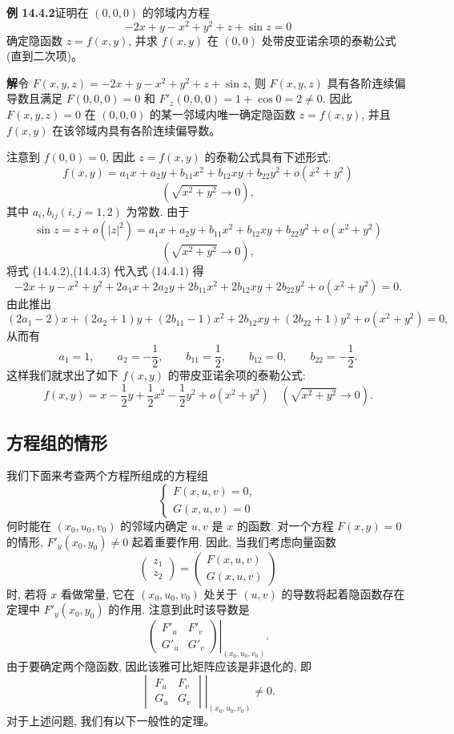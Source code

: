 \documentclass[UTF8, 12pt, fontset=fandol, oneside]{ctexart}
\begin{document}
\noindent\textbf{例 14.4.2}\quad 证明在 $(0,0,0)$ 的邻域内方程
\begin{equation}
  -2x+y-x^2+y^2+z+\sin z=0
  \tag{14.4.1}
\end{equation}
确定隐函数 $z=f(x,y)$, 并求 $f(x,y)$ 在 $(0,0)$ 处带皮亚诺余项的泰勒公式 (直到二次项)。

\noindent\textbf{解}\quad 令 $F(x,y,z)=-2x+y-x^2+y^2+z+\sin z$, 则 $F(x,y,z)$ 具有各阶连续偏导数且满足 $F(0,0,0)=0$ 和 $F'_z(0,0,0)=1+\cos0=2\ne0$. 因此 $F(x,y,z)=0$ 在 $(0,0,0)$ 的某一邻域内唯一确定隐函数 $z=f(x,y)$, 并且 $f(x,y)$ 在该邻域内具有各阶连续偏导数。

注意到 $f(0,0)=0$, 因此 $z=f(x,y)$ 的泰勒公式具有下述形式:
\begin{equation}
  f(x,y)=a_1x+a_2y+b_{11}x^2+b_{12}xy+b_{22}y^2+o(x^2+y^2)
  \tag{14.4.2}
\end{equation}
\[
  (\sqrt{x^2+y^2}\to0),
\]
其中 $a_i,b_{ij}(i,j=1,2)$ 为常数. 由于
\[
  \sin z=z+o(|z|^2)
  =a_1x+a_2y+b_{11}x^2+b_{12}xy+b_{22}y^2+o(x^2+y^2)
  \tag{14.4.3}
\]
\[
  (\sqrt{x^2+y^2}\to0),
\]
将式 (14.4.2),(14.4.3) 代入式 (14.4.1) 得
\[
  -2x+y-x^2+y^2+2a_1x+2a_2y+2b_{11}x^2+2b_{12}xy+2b_{22}y^2+o(x^2+y^2)=0.
\]
由此推出
\[
  (2a_1-2)x+(2a_2+1)y+(2b_{11}-1)x^2
  +2b_{12}xy+(2b_{22}+1)y^2+o(x^2+y^2)=0,
\]
从而有
\[
  a_1=1,\qquad a_2=-\frac12,\qquad b_{11}=\frac12,\qquad
  b_{12}=0,\qquad b_{22}=-\frac12.
\]
这样我们就求出了如下 $f(x,y)$ 的带皮亚诺余项的泰勒公式:
\[
  f(x,y)=x-\frac12y+\frac12x^2-\frac12y^2+o(x^2+y^2)
  \quad(\sqrt{x^2+y^2}\to0).
\]

\subsection{方程组的情形}

我们下面来考查两个方程所组成的方程组
\[
  \begin{cases}
    F(x,u,v)=0,\\
    G(x,u,v)=0
  \end{cases}
\]
何时能在 $(x_0,u_0,v_0)$ 的邻域内确定 $u,v$ 是 $x$ 的函数. 对一个方程 $F(x,y)=0$ 的情形, $F'_y(x_0,y_0)\ne0$ 起着重要作用. 因此, 当我们考虑向量函数
\[
  \begin{pmatrix}
    z_1\\
    z_2
  \end{pmatrix}
  =
  \begin{pmatrix}
    F(x,u,v)\\
    G(x,u,v)
  \end{pmatrix}
\]
时, 若将 $x$ 看做常量, 它在 $(x_0,u_0,v_0)$ 处关于 $(u,v)$ 的导数将起着隐函数存在定理中 $F'_y(x_0,y_0)$ 的作用. 注意到此时该导数是
\[
  \left.
  \begin{pmatrix}
    F'_u & F'_v\\
    G'_u & G'_v
  \end{pmatrix}
  \right|_{(x_0,u_0,v_0)}.
\]
由于要确定两个隐函数, 因此该雅可比矩阵应该是非退化的, 即
\[
  \left.
  \begin{vmatrix}
    F_u & F_v\\
    G_u & G_v
  \end{vmatrix}
  \right|_{(x_0,u_0,v_0)}\ne0.
\]
对于上述问题, 我们有以下一般性的定理。
\end{document}
